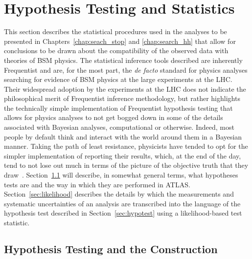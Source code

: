 \section{Hypothesis Testing and Statistics}
\label{sec:stat_hypo}

This section describes the statistical procedures used in the analyses to be
presented in Chapters~\ref{chap:seach_stop} and \ref{chap:search_hh} that allow
for conclusions to be drawn about the compatibility of the observed data with theories of
BSM physics.
The statistical inference tools described are inherently Frequentist and
are, for the most part, the \textit{de facto} standard for physics analyses searching for evidence of BSM physics
at the large experiments at the LHC.
Their widespread adoption by the experiments at the LHC does not indicate the
philosophical merit of Frequentist inference methodology, but rather highlights the technically simple implementation
of Frequentist hypothesis testing that allows for physics analyses to not get
bogged down in some of the details associated with Bayesian analyses, computational
or otherwise.
Indeed, most people by default think and interact with the world around them
in a Bayesian manner.
Taking the path of least resistance, physicists have tended to opt for the simpler
implementation of reporting their results, which, at the end of the day,
tend to not lose out much in terms of the picture of the objective truth that they draw~\cite{CousinsBayes}.
Section~\ref{sec:hypo_test} will describe, in somewhat general terms, what
hypotheses tests are and the way in which they are performed in ATLAS.
Section~\ref{sec:likelihood} describes the details by which the measurements and systematic
uncertainties of
an analysis are transcribed into the language of the hypothesis test described
in Section~\ref{sec:hypotest} using a likelihood-based test statistic.


%
%

\subsection{Hypothesis Testing and the \cls Construction}
\label{sec:hypo_test}

